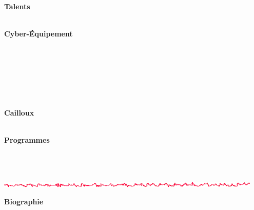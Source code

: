 \begin{minipage}[ht]{0.10\textwidth}
	~\\
\end{minipage} \hfill \begin{minipage}[ht]{0.38\textwidth}

	\textbf{\large Talents}~\\
	\CApersoTALENT ~\\
	
\end{minipage} \hfill \begin{minipage}[ht]{0.38\textwidth}
	
	\textbf{\large Cyber-{\'E}quipement}~\\
	\CApersoCYBEQU ~\\
	
\end{minipage} \hfill \begin{minipage}[ht]{0.10\textwidth}
	~\\
\end{minipage} ~\\

\begin{minipage}[ht]{0.10\textwidth}
	~\\
\end{minipage} \hfill \begin{minipage}[ht]{0.38\textwidth}

	\textbf{\large Cailloux}~\\
	\CApersoCAILLO ~\\

\end{minipage} \hfill \begin{minipage}[ht]{0.38\textwidth}

	\textbf{\large Programmes}~\\
	\CApersoPROGRA ~\\
	
\end{minipage} \hfill \begin{minipage}[ht]{0.10\textwidth}
	~\\
\end{minipage} %

	\begin{center}
		\includegraphics[width=0.95\textwidth]{Filet_CA.png}
	\end{center}

\textbf{\large Biographie}~\\
\CApersoBIOLIG ~\\
\CApersoBIOBIO ~\\


